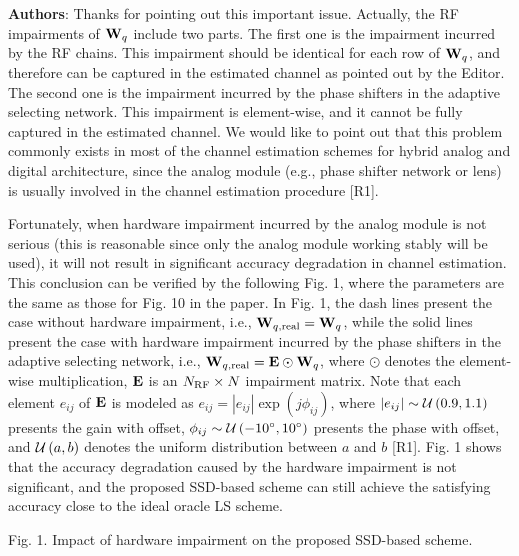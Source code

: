 \documentclass[a4paper,12pt]{article}
\begin{document}
{\color{blue} \textbf{Authors}: Thanks for pointing out this important issue. Actually, the RF impairments of ${{{\bf{W}}_q}}$ include two parts. The first one is the impairment incurred by the RF chains. This impairment should be identical for each row of ${{{\bf{W}}_q}}$, and therefore can be captured in the estimated channel as pointed out by the Editor. The second one is the impairment incurred by the phase shifters in the adaptive selecting network. This impairment is element-wise, and it cannot be fully captured in the estimated channel. We would like to point out that this problem commonly exists in most of the channel estimation schemes for hybrid analog and digital architecture, since the analog module (e.g., phase shifter network or lens) is usually involved in the channel estimation procedure [R1].



Fortunately, when hardware impairment incurred by the analog module is not serious (this is reasonable since only the analog module working stably will be used), it will not result in significant accuracy degradation in channel estimation. This conclusion can be verified by the following Fig. 1, where the parameters are the same as those for Fig. 10 in the paper. In Fig. 1, the dash lines present the case without hardware impairment, i.e., ${{{\bf{W}}_{q,{\rm{real}}}} = {{\bf{W}}_q}}$, while the solid lines present the case with hardware impairment incurred by the phase shifters in the adaptive selecting network, i.e., ${{{\bf{W}}_{q,{\rm{real}}}} = {\bf{E}} \odot {{\bf{W}}_q}}$, where ${ \odot }$ denotes the element-wise multiplication, ${{\bf{E}}}$ is an ${{N_{{\rm{RF}}}} \times N}$ impairment matrix. Note that each element ${{e_{ij}}}$ of ${{\bf{E}}}$ is modeled as ${{e_{ij}} = \left| {{e_{ij}}} \right|\exp \left( {j{\phi _{ij}}} \right)}$, where ${\left| {{e_{ij}}} \right|\sim{\cal U}\left( {0.9,1.1} \right)}$ presents the gain with offset, ${{\phi _{ij}} \sim {\cal U}\left( { - {{10}^ \circ },{{10}^ \circ }} \right)}$ presents the phase with offset, and ${{\cal U}\left( {a,b} \right)}$ denotes the uniform distribution between ${a}$ and ${b}$ [R1]. Fig. 1 shows that the accuracy degradation caused by the hardware impairment is not significant, and the proposed SSD-based scheme can still achieve the satisfying accuracy close to the ideal oracle LS scheme.

Fig. 1. Impact of hardware impairment on the proposed SSD-based scheme.

}
\end{document}
